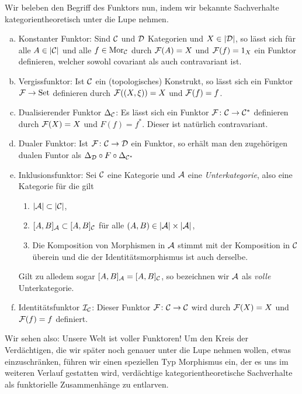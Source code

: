 Wir beleben den Begriff des Funktors nun, indem wir bekannte Sachverhalte kategorientheoretisch unter die Lupe nehmen.

\begin{ex}
  \label{ex:Example}
\begin{enumerate}[a)]
    \item Konstanter Funktor: Sind $\mathcal{C}$ und $\mathcal{D}$ Kategorien und $X \in |\mathcal{D}|$, so lässt sich für alle $A \in |\mathcal{C}|$ und alle $f \in \mathrm{Mor}_{\mathcal{C}}$ durch $\mathcal{F}(A) = X$ und $\mathcal{F}(f) = 1_X$ ein Funktor definieren, welcher sowohl covariant als auch contravariant ist.
    \item Vergissfunktor: Ist $\mathcal{C}$ ein (topologisches) Konstrukt, so lässt sich ein Funktor $\mathcal{F} \to \mathrm{Set}$ definieren durch $\mathcal{F}((X, \xi)) = X$ und $\mathcal{F}(f) = f$.
    \item Dualisierender Funktor $\Delta_{\mathcal{C}}$: Es lässt sich ein Funktor $\mathcal{F} \colon \mathcal{C} \to \mathcal{C}^*$ definieren durch $\mathcal{F}(X) = X$ und $F(f) = f^*$. Dieser ist natürlich contravariant.
    \item Dualer Funktor: Ist $\mathcal{F} \colon \mathcal{C} \to \mathcal{D}$ ein Funktor, so erhält man den zugehörigen dualen Funtor als $\Delta_{\mathcal{D}} \circ F \circ \Delta_{\mathcal{C}^*}$
    \item Inklusionsfunktor: Sei $\mathcal{C}$ eine Kategorie und $\mathcal{A}$ eine \emph{Unterkategorie}, also eine Kategorie für die gilt
      \begin{enumerate}
        \item $|\mathcal{A}| \subset |\mathcal{C}|$,
        \item $[A, B]_{\mathcal{A}} \subset [A,B]_{\mathcal{C}}$ für alle $(A, B) \in |\mathcal{A}| \times |\mathcal{A}|$,
        \item Die Komposition von Morphismen in $\mathcal{A}$ stimmt mit der Komposition in $\mathcal{C}$ überein und die der Identitätsmorphismus ist auch derselbe.
      \end{enumerate}
      Gilt zu alledem sogar $[A, B]_{\mathcal{A}} = [A, B]_{\mathcal{C}}$, so bezeichnen wir $\mathcal{A}$ als \emph{volle} Unterkategorie.
    \item Identitätsfunktor $\mathcal{I}_{\mathcal{C}}$: Dieser Funktor $\mathcal{F} \colon \mathcal{C} \to \mathcal{C}$ wird durch $\mathcal{F}(X) = X$ und $\mathcal{F}(f) = f$ definiert.
  \end{enumerate}
\end{ex}

Wir sehen also: Unsere Welt ist voller Funktoren! Um den Kreis der Verdächtigen, die wir später noch genauer unter die Lupe nehmen wollen, etwas einzuschränken, führen wir einen speziellen Typ Morphismus ein, der es uns im weiteren Verlauf gestatten wird, verdächtige kategorientheoretische Sachverhalte als funktorielle Zusammenhänge zu entlarven.

